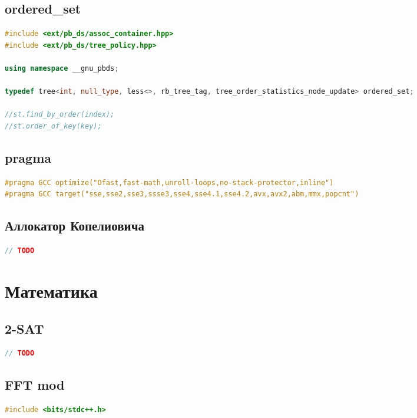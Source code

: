\documentclass[10pt,a4paper,landscape,twosided]{extarticle}
\begin{document}
\begin{multicols}{3}
\begin{lstlisting}[language=C++]
\end{lstlisting}

\subsection{ordered\_set}
\begin{lstlisting}[language=C++]
#include <ext/pb_ds/assoc_container.hpp>
#include <ext/pb_ds/tree_policy.hpp>

using namespace __gnu_pbds;

typedef tree<int, null_type, less<>, rb_tree_tag, tree_order_statistics_node_update> ordered_set;

//st.find_by_order(index);
//st.order_of_key(key);

\end{lstlisting}

\subsection{pragma}
\begin{lstlisting}[language=C++]
#pragma GCC optimize("Ofast,fast-math,unroll-loops,no-stack-protector,inline")
#pragma GCC target("sse,sse2,sse3,ssse3,sse4,sse4.1,sse4.2,avx,avx2,abm,mmx,popcnt")

\end{lstlisting}

\subsection{Аллокатор Копелиовича}
\begin{lstlisting}[language=C++]
// TODO

\end{lstlisting}

\section{Математика}

\subsection{2-SAT}
\begin{lstlisting}[language=C++]
// TODO

\end{lstlisting}

\subsection{FFT mod}
\begin{lstlisting}[language=C++]
#include <bits/stdc++.h>


\end{lstlisting}
\end{multicols}
\end{document}
